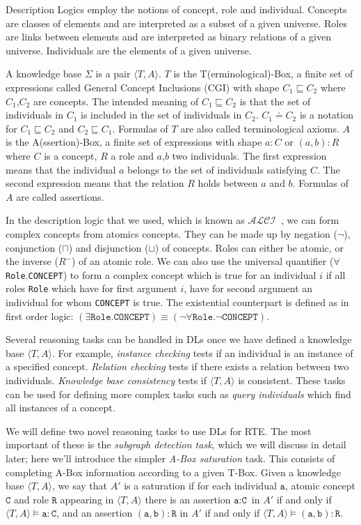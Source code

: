 \documentclass{esslli}
\newcommand{\dl}[1]{\texttt{#1}}
\newcommand{\dd}{{:}}
\begin{document}
Description Logics employ the notions of concept, role and
individual. Concepts are classes of elements and are interpreted as a
subset of a given universe. Roles are links between elements and are
interpreted as binary relations of a given universe. Individuals are
the elements of a given universe.

A knowledge base $\Sigma$ is a pair $\langle T,A
\rangle$. $T$ is the T(erminological)-Box, a finite set of expressions
called General Concept Inclusions (CGI) with shape $C_1 \sqsubseteq
C_2$ where $C_1$,$C_2$ are concepts. The intended meaning of $C_1
\sqsubseteq C_2$ is that the set of individuals in $C_1$ is included
in the set of individuals in $C_2$. $C_1 \doteq C_2$ is a notation for
$C_1 \sqsubseteq C_2$ and $C_2 \sqsubseteq C_1$. Formulas of $T$ are
also called terminological axioms. $A$ is the A(ssertion)-Box, a
finite set of expressions with shape $a \dd C$ or $(a,b) \dd R$ where
$C$ is a concept, $R$ a role and $a$,$b$ two individuals. The first
expression means that the individual $a$ belongs to the set of
individuals satisfying $C$. The second expression means that the
relation $R$ holds between $a$ and $b$. Formulas of $A$ are called
assertions.


In the description logic that we used, which is known as
$\mathcal{ALCI}$~\cite{DBLP:conf/dlog/2003handbook}, we can form
complex concepts from atomics concepts. They can be made up by
negation ($\neg$), conjunction ($\sqcap$) and disjunction ($\sqcup$)
of concepts. Roles can either be atomic, or the inverse ($R^-$) of an
atomic role. We can also use the universal quantifier ($\forall$
\dl{Role}.\dl{CONCEPT}) to form a complex concept which is true for an
individual $i$ if all roles \dl{Role} which have for first argument
$i$, have for second argument an individual for whom \dl{CONCEPT} is
true. The existential counterpart is  defined as in first order logic:
$(\exists\dl{Role}.\dl{CONCEPT}) \equiv
(\neg\forall\dl{Role}.\neg\dl{CONCEPT})$.


Several reasoning tasks can be handled in DLs once we have defined a
knowledge base $\langle T,A \rangle$. For example, \emph{instance
  checking} tests if an individual is an instance of a specified
concept. \emph{Relation checking} tests if there exists a relation
between two individuals. \emph{Knowledge base consistency} tests if
$\langle T,A \rangle$ is consistent. These tasks can be used for
defining more complex tasks such as \emph{query individuals} which
find all instances of a concept.


We will define two novel reasoning tasks to use DLs for RTE. The most
important of these is the \textit{subgraph detection task}, which we
will discuss in detail later; here we'll introduce the simpler
\emph{A-Box saturation} task. This consists of completing A-Box
information according to a given T-Box. Given a knowledge base
$\langle T,A \rangle$, we say that $A'$ is a saturation if for each
individual $\dl{a}$, atomic concept $\dl{C}$ and role $\dl{R}$
appearing in $\langle T,A \rangle$ there is an assertion $\dl{a} \dd
\dl{C}$ in $A'$ if and only if $\langle T,A \rangle \models \dl{a} \dd
\dl{C}$, and an assertion $(\dl{a},\dl{b})\dd\dl{R}$ in $A'$ if and
only if $\langle T,A \rangle \models (\dl{a},\dl{b})\dd\dl{R}$.
\end{document}
